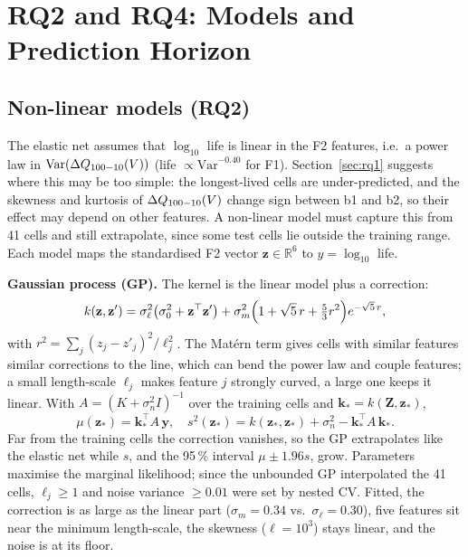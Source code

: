 \section{RQ2 and RQ4: Models and Prediction Horizon}
\label{sec:rq2}

\subsection{Non-linear models (RQ2)}
The elastic net assumes that $\log_{10}$ life is linear in the F2 features,
i.e.\ a power law in $\mathrm{Var}(\Delta Q_{100-10}(V))$ (life $\propto\mathrm{Var}^{-0.40}$
for F1). Section~\ref{sec:rq1} suggests where this may be too simple: the
longest-lived cells are under-predicted, and the skewness and kurtosis of
$\Delta Q_{100-10}(V)$ change sign between b1 and b2, so their effect may depend on other
features. A non-linear model must capture this from 41 cells and still
extrapolate, since some test cells lie outside the training range. Each
model maps the standardised F2 vector $\mathbf z\in\mathbb R^6$ to
$y=\log_{10}$ life.

\textbf{Gaussian process (GP).} The kernel is the linear model plus a
correction:
\begin{equation}
k(\mathbf z,\mathbf z')=\sigma_\ell^2\bigl(\sigma_0^2+\mathbf z^\top\mathbf z'\bigr)
+\sigma_m^2\Bigl(1+\sqrt5\,r+\tfrac53r^2\Bigr)e^{-\sqrt5\,r},
\label{eq:gpkernel}
\end{equation}
with $r^2=\sum_j (z_j-z'_j)^2/\ell_j^2$. The Mat\'ern term gives cells with
similar features similar corrections to the line, which can bend the power
law and couple features; a small length-scale $\ell_j$ makes feature $j$
strongly curved, a large one keeps it linear. With
$A=(K+\sigma_n^2I)^{-1}$ over the training cells and
$\mathbf k_*=k(\mathbf Z,\mathbf z_*)$,
\begin{equation}
\mu(\mathbf z_*)=\mathbf k_*^\top A\,\mathbf y,\quad
s^2(\mathbf z_*)=k(\mathbf z_*,\mathbf z_*)+\sigma_n^2-\mathbf k_*^\top A\,\mathbf k_*.
\end{equation}
Far from the training cells the correction vanishes, so the GP extrapolates
like the elastic net while $s$, and the 95\,\% interval $\mu\pm1.96s$, grow.
Parameters maximise the marginal likelihood; since the unbounded GP
interpolated the 41 cells, $\ell_j\ge1$ and noise variance $\ge0.01$ were
set by nested CV. Fitted, the correction is as large as the linear part
($\sigma_m=0.34$ vs.\ $\sigma_\ell=0.30$), five features sit near the minimum
length-scale, the skewness ($\ell=10^3$) stays linear, and the noise is at
its floor.

